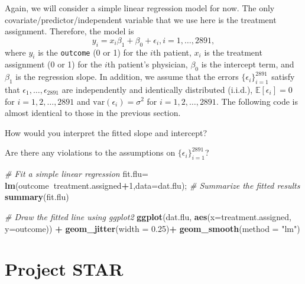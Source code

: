 \documentclass[12pt,]{book}
\newenvironment{Shaded}{\begin{snugshade}}{\end{snugshade}}
\newcommand{\KeywordTok}[1]{\textcolor[rgb]{0.13,0.29,0.53}{\textbf{#1}}}
\newcommand{\DataTypeTok}[1]{\textcolor[rgb]{0.13,0.29,0.53}{#1}}
\newcommand{\DecValTok}[1]{\textcolor[rgb]{0.00,0.00,0.81}{#1}}
\newcommand{\FloatTok}[1]{\textcolor[rgb]{0.00,0.00,0.81}{#1}}
\newcommand{\StringTok}[1]{\textcolor[rgb]{0.31,0.60,0.02}{#1}}
\newcommand{\CommentTok}[1]{\textcolor[rgb]{0.56,0.35,0.01}{\textit{#1}}}
\newcommand{\OperatorTok}[1]{\textcolor[rgb]{0.81,0.36,0.00}{\textbf{#1}}}
\newcommand{\NormalTok}[1]{#1}
\begin{document}
Again, we will consider a simple linear regression model for now. The
only covariate/predictor/independent variable that we use here is the
treatment assignment. Therefore, the model is \[
    y_i = x_i \beta_1  +\beta_0 +  \epsilon_i, i=1,\ldots, 2891,
    \] where \(y_i\) is the \texttt{outcome} (0 or 1) for the \(i\)th
patient, \(x_i\) is the treatment assignment (0 or 1) for the \(i\)th
patient's physician, \(\beta_0\) is the intercept term, and \(\beta_1\)
is the regression slope. In addition, we assume that the errors
\(\{\epsilon_i\}_{i=1}^{2891}\) satisfy that
\(\epsilon_1,\ldots, \epsilon_{2891}\) are independently and identically
distributed (i.i.d.), \(\mathbb{E}[\epsilon_i]= 0\) for
\(i=1,2,\ldots, 2891\) and \(\mathrm{var}(\epsilon_i)=\sigma^2\) for
\(i=1,2,\ldots, 2891\). The following code is almost identical to those
in the previous section.

How would you interpret the fitted slope and intercept?

Are there any violations to the assumptions on
\(\{\epsilon_i\}_{i=1}^{2891}\)?

\begin{Shaded}
\begin{Highlighting}[]
\CommentTok{# Fit a simple linear regression}
\NormalTok{fit.flu=}\StringTok{ }\KeywordTok{lm}\NormalTok{(outcome}\OperatorTok{~}\NormalTok{treatment.assigned}\OperatorTok{+}\DecValTok{1}\NormalTok{,}\DataTypeTok{data=}\NormalTok{dat.flu); }
\CommentTok{# Summarize the fitted results}
\KeywordTok{summary}\NormalTok{(fit.flu) }

\CommentTok{# Draw the fitted line using ggplot2 }
\KeywordTok{ggplot}\NormalTok{(dat.flu, }\KeywordTok{aes}\NormalTok{(}\DataTypeTok{x=}\NormalTok{treatment.assigned, }\DataTypeTok{y=}\NormalTok{outcome)) }\OperatorTok{+}\StringTok{ }
\StringTok{  }\KeywordTok{geom_jitter}\NormalTok{(}\DataTypeTok{width =} \FloatTok{0.25}\NormalTok{)}\OperatorTok{+}
\StringTok{  }\KeywordTok{geom_smooth}\NormalTok{(}\DataTypeTok{method =} \StringTok{"lm"}\NormalTok{)}
\end{Highlighting}
\end{Shaded}

\section{Project STAR}\label{project-star}
\end{document}
